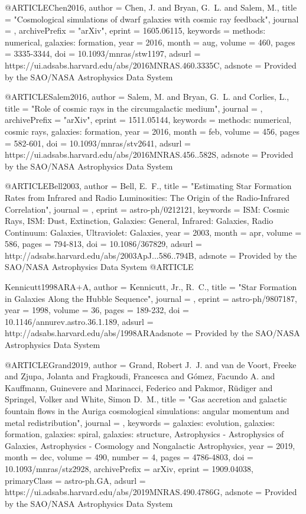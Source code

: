 \documentclass[useAMS,usenatbib]{mnras}
\begin{document}
{@ARTICLE{Chen2016,
   author = {{Chen}, J. and {Bryan}, G.~L. and {Salem}, M.},
    title = "{Cosmological simulations of dwarf galaxies with cosmic ray feedback}",
  journal = {\mnras},
archivePrefix = "arXiv",
   eprint = {1605.06115},
 keywords = {methods: numerical, galaxies: formation},
     year = 2016,
    month = aug,
   volume = 460,
    pages = {3335-3344},
      doi = {10.1093/mnras/stw1197},
   adsurl = {https://ui.adsabs.harvard.edu/abs/2016MNRAS.460.3335C},
  adsnote = {Provided by the SAO/NASA Astrophysics Data System}
}

@ARTICLE{Salem2016,
   author = {{Salem}, M. and {Bryan}, G.~L. and {Corlies}, L.},
    title = "{Role of cosmic rays in the circumgalactic medium}",
  journal = {\mnras},
archivePrefix = "arXiv",
   eprint = {1511.05144},
 keywords = {methods: numerical, cosmic rays, galaxies: formation},
     year = 2016,
    month = feb,
   volume = 456,
    pages = {582-601},
      doi = {10.1093/mnras/stv2641},
   adsurl = {https://ui.adsabs.harvard.edu/abs/2016MNRAS.456..582S},
  adsnote = {Provided by the SAO/NASA Astrophysics Data System}
}

@ARTICLE{Bell2003,
   author = {{Bell}, E.~F.},
    title = "{Estimating Star Formation Rates from Infrared and Radio Luminosities: The Origin of the Radio-Infrared Correlation}",
  journal = {\apj},
   eprint = {astro-ph/0212121},
 keywords = {ISM: Cosmic Rays, ISM: Dust, Extinction, Galaxies: General, Infrared: Galaxies, Radio Continuum: Galaxies, Ultraviolet: Galaxies},
     year = 2003,
    month = apr,
   volume = 586,
    pages = {794-813},
      doi = {10.1086/367829},
   adsurl = {http://adsabs.harvard.edu/abs/2003ApJ...586..794B},
  adsnote = {Provided by the SAO/NASA Astrophysics Data System}
}
@ARTICLE{Kennicutt1998ARA+A,
   author = {{Kennicutt}, Jr., R.~C.},
    title = "{Star Formation in Galaxies Along the Hubble Sequence}",
  journal = {\araa},
   eprint = {astro-ph/9807187},
     year = 1998,
   volume = 36,
    pages = {189-232},
      doi = {10.1146/annurev.astro.36.1.189},
   adsurl = {http://adsabs.harvard.edu/abs/1998ARAadsnote = {Provided by the SAO/NASA Astrophysics Data System}
}

@ARTICLE{Grand2019,
       author = {{Grand}, Robert J.~J. and {van de Voort}, Freeke and {Zjupa}, Jolanta and
         {Fragkoudi}, Francesca and {G{\'o}mez}, Facundo A. and
         {Kauffmann}, Guinevere and {Marinacci}, Federico and
         {Pakmor}, R{\"u}diger and {Springel}, Volker and {White}, Simon D.~M.},
        title = "{Gas accretion and galactic fountain flows in the Auriga cosmological simulations: angular momentum and metal redistribution}",
      journal = {\mnras},
     keywords = {galaxies: evolution, galaxies: formation, galaxies: spiral, galaxies: structure, Astrophysics - Astrophysics of Galaxies, Astrophysics - Cosmology and Nongalactic Astrophysics},
         year = 2019,
        month = dec,
       volume = {490},
       number = {4},
        pages = {4786-4803},
          doi = {10.1093/mnras/stz2928},
archivePrefix = {arXiv},
       eprint = {1909.04038},
 primaryClass = {astro-ph.GA},
       adsurl = {https://ui.adsabs.harvard.edu/abs/2019MNRAS.490.4786G},
      adsnote = {Provided by the SAO/NASA Astrophysics Data System}
}


}}
\end{document}
